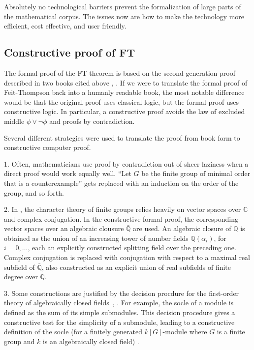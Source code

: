 \documentclass[brochure,english,12pt]{bourbaki}
\theoremstyle{plain}
\def\ring#1{{\mathbb{#1}}}
\begin{document}
Absolutely no technological barriers 
prevent the formalization of large parts of the mathematical corpus.  The issues now
are how to make the technology more efficient, cost effective, and user friendly.

\subsection{Constructive proof of FT}

The formal proof of the FT theorem is based on the second-generation proof described in
two books cited above \cite{bender1994local},  \cite{peterfalvi2000character}.
If we were to translate the formal proof of Feit-Thompson back into a humanly readable book, 
the most notable difference would be that the original proof uses classical logic,
but the formal proof uses constructive logic.  In particular, a constructive proof avoids
 the law of excluded middle $\phi\lor \neg \phi$ and proofs by contradiction.

Several different strategies were used to translate the proof from book form to
constructive computer proof.

1.  Often, mathematicians use proof by contradiction out of sheer laziness when a direct proof
would work equally well.  
``Let $G$ be the finite group of minimal order that is a counterexample'' gets
replaced with an induction on the order of the group, and so forth.

2. In \cite{peterfalvi2000character},  the character theory of finite groups relies heavily on 
vector spaces over $\ring{C}$ and complex conjugation.  In the constructive formal proof, the corresponding
vector spaces over an algebraic clousure $\bar{\ring{Q}}$ are used.  An algebraic closure of $\ring{Q}$ 
is obtained as the union of an increasing tower of  
number fields $\ring{Q}(\alpha_i)$, for $i=0,\ldots$, each  an explicitly constructed splitting field
over the preceding one.
Complex conjugation is replaced with
conjugation with respect to a maximal real subfield of $\bar{\ring{Q}}$, also constructed
as an explicit union of real subfields of finite degree over $\ring{Q}$.

3.  Some constructions are justified by the decision procdure for the first-order theory
of algebraically closed fields~\cite{cohen2010formal}, \cite{Ha09}.  
For example, the socle of a module is defined as the sum of its
simple submodules.  This decision procedure gives a constructive test for the simplicity of a submodule,
leading to a constructive definition of the socle  (for a finitely generated 
$k[G]$-module where $G$ is a finite group and $k$ is an algebraically closed field)  \cite{gonthier2011point}.
\end{document}
